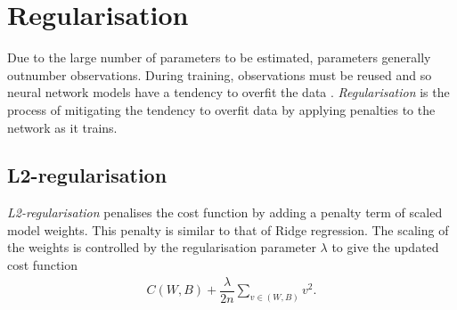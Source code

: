 


\section{Regularisation}\label{nnet-reg}

Due to the large number of parameters to be estimated, parameters generally outnumber observations. During training, observations must be reused and so neural network models have a tendency to overfit the data \citep{Nielson2015}. \textit{Regularisation} is the process of mitigating the tendency to overfit data by applying penalties to the network as it trains.

\subsection*{L2-regularisation}\label{nnet-l2reg}


\textit{L2-regularisation} penalises the cost function by adding a penalty term of scaled model weights. This penalty is similar to that of Ridge regression. The scaling of the weights is controlled by the regularisation parameter $\lambda$ to give the updated cost function
\begin{align}
	C(W,B) + \dfrac{\lambda}{2n}\sum_{v\in (W,B)}v^2.
\end{align}



